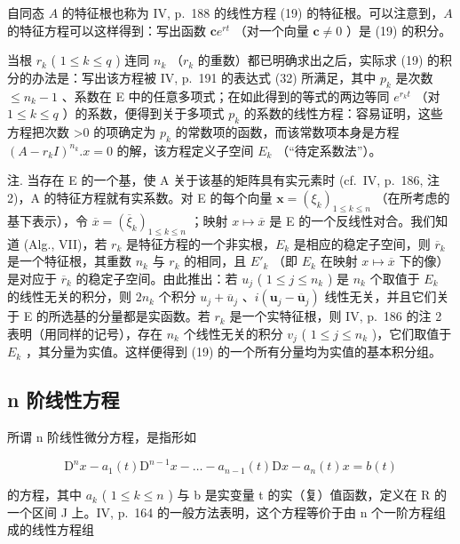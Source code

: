 自同态 \(A\) 的特征根也称为 IV, p.~188 的线性方程 (19) 的特征根。可以注意到，\(A\) 的特征方程可以这样得到：写出函数 \(\mathbf{c}e^{rt}\) （对一个向量 \(\mathbf{c} \neq 0\) ）是 (19) 的积分。

当根 \(r_{k}\) ( \(1 \leqslant k \leqslant q\) ) 连同 \(n_{k}\) （\(r_{k}\) 的重数）都已明确求出之后，实际求 (19) 的积分的办法是：写出该方程被 IV, p.~191 的表达式 (32) 所满足，其中 \(p_{k}\) 是次数 \(\leqslant n_{k}-1\) 、系数在 E 中的任意多项式；在如此得到的等式的两边等同 \(e^{r_{k}t}\) （对 \(1 \leqslant k \leqslant q\) ）的系数，便得到关于多项式 \(p_{k}\) 的系数的线性方程：容易证明，这些方程把次数 \textgreater0 的项确定为 \(p_{k}\) 的常数项的函数，而该常数项本身是方程 \((A - r_{k}I)^{n_{k}}.x = 0\) 的解，该方程定义子空间 \(E_{k}\) （“待定系数法”）。

注. 当存在 E 的一个基，使 A 关于该基的矩阵具有实元素时 (cf.~IV, p.~186, 注 2)，A 的特征方程就有实系数。对 E 的每个向量 \(\mathbf{x} = (\xi_k)_{1 \leqslant k \leqslant n}\) （在所考虑的基下表示），令 \(\overline{x} = (\overline{\xi}_k)_{1 \leqslant k \leqslant n}\) ；映射 \(x \mapsto \overline{x}\) 是 E 的一个反线性对合。我们知道 (Alg., VII)，若 \(r_k\) 是特征方程的一个非实根，\(E_k\) 是相应的稳定子空间，则 \(\overline{r}_k\) 是一个特征根，其重数 \(n_k\) 与 \(r_k\) 的相同，且 \(E'_k\) （即 \(E_k\) 在映射 \(x \mapsto \overline{x}\) 下的像）是对应于 \(\overline{r}_k\) 的稳定子空间。由此推出：若 \(u_j\) ( \(1 \leqslant j \leqslant n_k\) ) 是 \(n_k\) 个取值于 \(E_k\) 的线性无关的积分，则 \(2n_k\) 个积分 \(u_j + \overline{u}_j\) 、\(i(\mathbf{u}_j - \overline{\mathbf{u}}_j)\) 线性无关，并且它们关于 E 的所选基的分量都是实函数。若 \(r_k\) 是一个实特征根，则 IV, p.~186 的注 2 表明（用同样的记号），存在 \(n_k\) 个线性无关的积分 \(v_j\) ( \(1 \leqslant j \leqslant n_k\) )，它们取值于 \(E_k\) ，其分量为实值。这样便得到 (19) 的一个所有分量均为实值的基本积分组。

\subsection{n 阶线性方程}

所谓 n 阶线性微分方程，是指形如

\[
\mathrm{D} ^ {n} x - a _ {1} (t) \mathrm{D} ^ {n - 1} x - \dots - a _ {n - 1} (t) \mathrm{D} x - a _ {n} (t) x = b (t)\tag{33}
\]

的方程，其中 \(a_{k}\) ( \(1 \leqslant k \leqslant n\) ) 与 b 是实变量 t 的实（复）值函数，定义在 R 的一个区间 J 上。IV, p.~164 的一般方法表明，这个方程等价于由 n 个一阶方程组成的线性方程组

